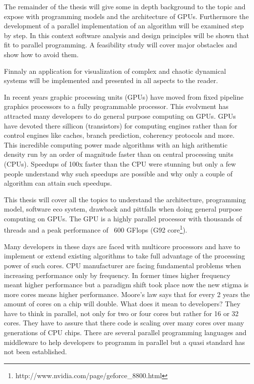 The remainder of the thesis will give some in depth background to the topic and
expose with programming models and the architecture of GPUs. Furthermore the
development of a parallel implementation of an algorithm will be examined step
by step. In this context software analysis and design principles will be shown
that fit to parallel programming. A feasibility study will cover major obstacles
and show how to avoid them.

Finnaly an application for visualization of complex and chaotic dynamical
systems will be implemented and presented in all aspects to the reader.

In recent years graphic processing units (GPUs) have moved from fixed pipeline
graphics processors to a fully programmable processor. This evolvment has
attracted many developers to do general purpose computing on GPUs. GPUs have
devoted there sillicon (transistors) for computing engines rather than for
control engines like caches, branch prediction, coherency protocols and more.
This incredible computing power made algorithms with an high arithemtic density
run by an order of magnitude faster than on central processing units (CPUs).
Speedups of 100x faster than the CPU were stunning but only a few people
understand why such speedups are possible and why only a couple of algorithm can
attain such speedups.

This thesis will cover all the topics to understand the architecture,
programming model, software eco system, drawback and pittfalls when doing
general purpose computing on GPUs. The \gls{GPU} is a highly parallel processor with
thousands of threads and a peak performance of ~600 GFlops (G92
core\footnote{http://www.nvidia.com/page/geforce\_8800.html}).

Many developers in these days are faced with multicore processors and have to
implement or extend existing algorithms to take full advantage of the
processing power of such cores. CPU manufacturer are facing fundamental problems
when increasing performance only by frequency. In former times higher frequency
meant higher performance but a paradigm shift took place now the new stigma is
more cores means higher performance. Moore's law says that for every 2 years the
amount of cores on a chip will double. What does it mean to developers? They
have to think in parallel, not only for two or four cores but rather for 16 or
32 cores. They have to assure that there code is scaling over many cores over
many generations of CPU chips. There are several parallel programming languages
and middleware to help developers to programm in parallel but a quasi standard
has not been established.

